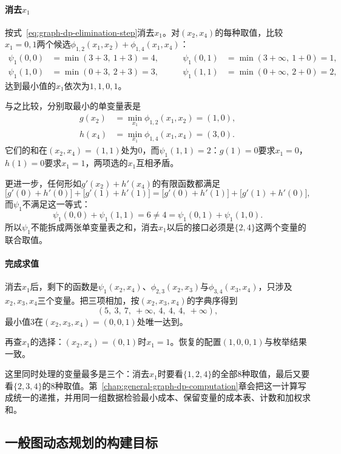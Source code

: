 \paragraph{消去$x_1$}
按式~\eqref{eq:graph-dp-elimination-step}消去$x_1$。对$(x_2,x_4)$的每种取值，比较$x_1=0,1$两个候选$\phi_{1,2}(x_1,x_2)+\phi_{1,4}(x_1,x_4)$：
\[
\begin{aligned}
\psi_1(0,0)&=\min(3+3,\ 1+3)=4,&\qquad \psi_1(0,1)&=\min(3+\infty,\ 1+0)=1,\\
\psi_1(1,0)&=\min(0+3,\ 2+3)=3,&\qquad \psi_1(1,1)&=\min(0+\infty,\ 2+0)=2,
\end{aligned}
\]
达到最小值的$x_1$依次为$1,1,0,1$。

与之比较，分别取最小的单变量表是
\[
\begin{aligned}
g(x_2)&=\min_{x_1}\phi_{1,2}(x_1,x_2)=(1,0),\\
h(x_4)&=\min_{x_1}\phi_{1,4}(x_1,x_4)=(3,0).
\end{aligned}
\]
它们的和在$(x_2,x_4)=(1,1)$处为$0$，而$\psi_1(1,1)=2$：$g(1)=0$要求$x_1=0$，$h(1)=0$要求$x_1=1$，两项选的$x_1$互相矛盾。

更进一步，任何形如$g'(x_2)+h'(x_4)$的有限函数都满足
\[
\bigl[g'(0)+h'(0)\bigr]+\bigl[g'(1)+h'(1)\bigr]=\bigl[g'(0)+h'(1)\bigr]+\bigl[g'(1)+h'(0)\bigr],
\]
而$\psi_1$不满足这一等式：
\[
\psi_1(0,0)+\psi_1(1,1)=6\neq4=\psi_1(0,1)+\psi_1(1,0).
\]
所以$\psi_1$不能拆成两张单变量表之和，消去$x_1$以后的接口必须是$\{2,4\}$这两个变量的联合取值。

\paragraph{完成求值}
消去$x_1$后，剩下的函数是$\psi_1(x_2,x_4)$、$\phi_{2,3}(x_2,x_3)$与$\phi_{3,4}(x_3,x_4)$，只涉及$x_2,x_3,x_4$三个变量。把三项相加，按$(x_2,x_3,x_4)$的字典序得到
\[
(5,\ 3,\ 7,\ +\infty,\ 4,\ 4,\ 4,\ +\infty),
\]
最小值$3$在$(x_2,x_3,x_4)=(0,0,1)$处唯一达到。

再查$x_1$的选择：$(x_2,x_4)=(0,1)$时$x_1=1$。恢复的配置$(1,0,0,1)$与枚举结果一致。

这里同时处理的变量最多是三个：消去$x_1$时要看$\{1,2,4\}$的全部$8$种取值，最后又要看$\{2,3,4\}$的$8$种取值。第~\ref{chap:general-graph-dp-computation}章会把这一计算写成统一的递推，并用同一组数据检验最小成本、保留变量的成本表、计数和加权求和。

\subsection{一般图动态规划的构建目标}
\label{sec:graph-dp-construction-goal}

